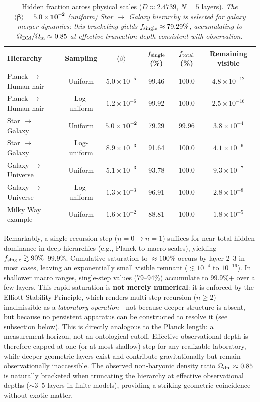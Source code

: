 \documentclass[11pt,a4paper]{article}
\begin{document}
\begin{table}[h]
\centering
\caption{Hidden fraction across physical scales ($D \approx 2.4739$, $N=5$ layers). \emph{The $\mathbf{\langle \beta \rangle = 5.0 \times 10^{-2}}$ (uniform) Star $\to$ Galaxy hierarchy is selected for galaxy merger dynamics: this bracketing yields $f_{\rm single} \approx 79.29\%$, accumulating to $\Omega_{\rm DM}/\Omega_{\rm m} \approx 0.85$ at effective truncation depth consistent with observation.}}
\begin{tabular}{lccccc}
\hline
Hierarchy & Sampling & $\langle \beta \rangle$ & $f_{\rm single}$ (\%) & $f_{\rm total}$ (\%) & Remaining visible \\
\hline
Planck $\to$ Human hair & Uniform & $5.0 \times 10^{-5}$ & 99.46 & 100.0 & $4.8 \times 10^{-12}$ \\
Planck $\to$ Human hair & Log-uniform & $1.2 \times 10^{-6}$ & 99.92 & 100.0 & $2.5 \times 10^{-16}$ \\
Star $\to$ Galaxy & Uniform & $\mathbf{5.0 \times 10^{-2}}$ & 79.29 & 99.96 & $3.8 \times 10^{-4}$ \\
Star $\to$ Galaxy & Log-uniform & $8.9 \times 10^{-3}$ & 91.64 & 100.0 & $4.1 \times 10^{-6}$ \\
Galaxy $\to$ Universe & Uniform & $5.1 \times 10^{-3}$ & 93.78 & 100.0 & $9.3 \times 10^{-7}$ \\
Galaxy $\to$ Universe & Log-uniform & $1.3 \times 10^{-3}$ & 96.91 & 100.0 & $2.8 \times 10^{-8}$ \\
Milky Way example & Uniform & $1.6 \times 10^{-2}$ & 88.81 & 100.0 & $1.8 \times 10^{-5}$ \\
\hline
\end{tabular}
\label{tab:dark-fractions}
\end{table}

Remarkably, a single recursion step ($n=0 \to n=1$) suffices for near-total hidden dominance in deep hierarchies (e.g., Planck-to-macro scales), yielding $f_{\rm single} \gtrsim 90\%$--$99.9\%$. Cumulative saturation to $\approx 100\%$ occurs by layer 2--3 in most cases, leaving an exponentially small visible remnant ($\lesssim 10^{-4}$ to $10^{-16}$). In shallower macro ranges, single-step values (79--94\%) accumulate to 99.9\%+ over a few layers. This rapid saturation is \textbf{not merely numerical}: it is enforced by the Elliott Stability Principle, which renders multi-step recursion ($n \geq 2$) inadmissible as a \emph{laboratory operation}---not because deeper structure is absent, but because no persistent apparatus can be constructed to resolve it (see subsection below). This is directly analogous to the Planck length: a measurement horizon, not an ontological cutoff. Effective observational depth is therefore capped at one (or at most shallow) step for any realizable laboratory, while deeper geometric layers exist and contribute gravitationally but remain observationally inaccessible. The observed non-baryonic density ratio $\Omega_{\rm dm} \approx 0.85$ is naturally bracketed when truncating the hierarchy at effective observational depths ($\sim$3--5 layers in finite models), providing a striking geometric coincidence without exotic matter.
\end{document}
